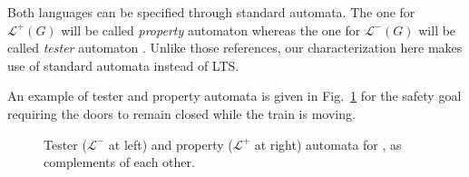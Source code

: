 Both languages can be specified through standard automata. The one for $\mathcal{L}^{+}(G)$ will be called \emph{property} automaton \cite{Letier:2005} whereas the one for $\mathcal{L}^{-}(G)$ will be called \emph{tester} automaton \cite{Giannakopoulou:2003}. Unlike those references, our characterization here makes use of standard automata instead of LTS.

An example of tester and property automata is given in Fig.~\ref{image:tester-and-property-automata} for the safety goal requiring the doors to remain closed while the train is moving.
\begin{figure}\centering
{}
\caption[Tester and property automata, as complements of each other.]{Tester ($\mathcal{L}^{-}$ at left) and property ($\mathcal{L}^{+}$ at right) automata for , as complements of each other.\label{image:tester-and-property-automata}}
\end{figure}

